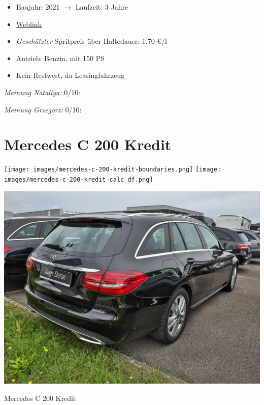 \documentclass[landscape, DIV=99, 14pt]{scrartcl}
\begin{document}
\begin{itemize}
    \item Baujahr: 2021 $\rightarrow$ Laufzeit: 3 Jahre
    \item \href{https://www.autosuche.de/auto/REVVNDQ3NjgwMjc5NzI=?t_manuf=BQ&t_petr=B&t_model=BQBM&t_gear=A&t_ez_fr=2020&t_pe_fr=35000&sort=PRICE_SALE&sortdirection=ASC&viewMode=tile}{Weblink}
    \item \emph{Gesch\"atzter} Spritpreis \"uber Haltedauer: 1.70 \euro{}/l
    \item Antrieb: Benzin, mit 150 PS
    \item Kein Restwert, da Leasingfahrzeug
\end{itemize}

\begin{small}
\emph{Meinung Nataliya:} 0/10: 
        
\emph{Meinung Grzegorz:} 0/10: 
\end{small}

\pagebreak


\twocolumn

\section*{Mercedes C 200 Kredit}
\begin{center}
\texttt{[image: images/mercedes-c-200-kredit-boundaries.png]}
\null
\vspace{0.5cm}
\texttt{[image: images/mercedes-c-200-kredit-calc\_df.png]}
\end{center}

\pagebreak
\begin{center}
\includegraphics[width=0.9\columnwidth]{cars/mercedes-c-200-t-leasing.png}

Mercedes C 200 Kredit
\end{center}
\end{document}
